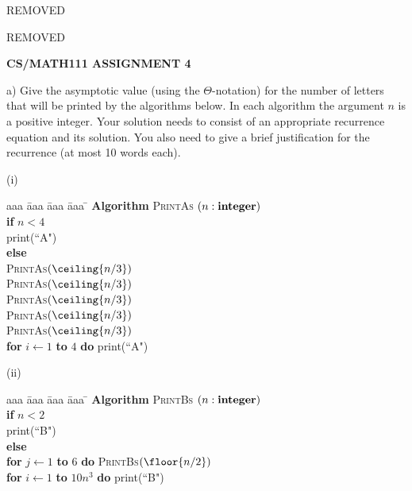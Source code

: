 \documentclass{article}
\begin{document}
\centerline{REMOVED}
\centerline{REMOVED}
\centerline{\large \bf CS/MATH111 ASSIGNMENT 4}

\vskip 0.2in


\vskip 0.1in


\begin{problem}
a)
Give the asymptotic value (using the $\Theta$-notation)
for the number of letters that will be printed by the algorithms below.
In each algorithm the argument $n$ is a positive integer.
Your solution needs to consist of an appropriate recurrence 
equation and its solution. You also need to give a brief justification for
the recurrence (at most 10 words each). 

\bigskip
\noindent
(i)\ \ 
\begin{minipage}[t]{3in}
\begin{tabbing}
aaa \= aaa \= aaa \= aaa \=  \kill
\textbf{Algorithm} \textsc{PrintAs} $(n: \mbox{\bf integer})$ \\
          \> \textbf{if} $n < 4$ \\
          \>\>  print(``A") \\
          \>\textbf{else} \\
          \>\>  \textsc{PrintAs}$(\ceiling{n/3})$\\
          \>\>  \textsc{PrintAs}$(\ceiling{n/3})$\\
          \>\>  \textsc{PrintAs}$(\ceiling{n/3})$\\
          \>\>  \textsc{PrintAs}$(\ceiling{n/3})$\\
           \>\>  \textsc{PrintAs}$(\ceiling{n/3})$\\
      \>\> \textbf{for} $i \leftarrow 1$ \textbf{to} $4$ \textbf{do} print(``A")
\end{tabbing}
\end{minipage}

\bigskip
\noindent
(ii)\ \
\begin{minipage}[t]{3in}
\begin{tabbing}
aaa \= aaa \= aaa \= aaa \=  \kill
\textbf{Algorithm} \textsc{PrintBs} $(n: \mbox{\bf integer})$ \\
          \> \textbf{if} $n < 2$ \\
          \>\>  print(``B") \\
          \>\textbf{else} \\
          \>\>  \textbf{for} $j \leftarrow 1$ \textbf{to} $6$ 
					\textbf{do} \textsc{PrintBs}$(\floor{n/2})$\\
      \>\> \textbf{for} $i \leftarrow 1$ \textbf{to} $10n^3$ \textbf{do} print(``B")
\end{tabbing}
\end{minipage}


\end{problem}
\end{document}
